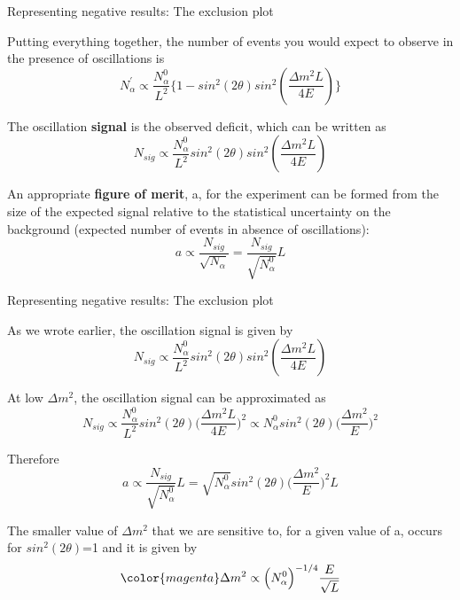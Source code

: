 \begin{frame}{Representing negative results: The exclusion plot}

Putting everything together,
the number of events you would expect to observe in the presence of oscillations is
\begin{equation*}
     N^{\prime}_{\alpha} \propto \frac{N^{0}_{\alpha}}{L^2}
       \Big\{1 - sin^{2} (2\theta) sin^2(\frac{\Delta m^{2}L}{4E})\Big\}
\end{equation*}

The oscillation {\bf signal} is the observed deficit, which can be written as
\begin{equation*}
     N_{sig} \propto \frac{N^{0}_{\alpha}}{L^2} sin^{2} (2\theta) sin^2(\frac{\Delta m^{2}L}{4E})
\end{equation*}

An appropriate {\bf figure of merit}, a, for the experiment can be formed from
the size of the expected signal relative to the statistical uncertainty on the
background (expected number of events in absence of oscillations):
\begin{equation*}
     a \propto \frac{N_{sig}}{\sqrt{N_{\alpha}}} = \frac{N_{sig}}{\sqrt{N^{0}_{\alpha}}} L
\end{equation*}

\end{frame}

%
%
%

\begin{frame}{Representing negative results: The exclusion plot}

As we wrote earlier, the oscillation signal is given by
\begin{equation*}
     N_{sig} \propto \frac{N^{0}_{\alpha}}{L^2} sin^{2} (2\theta) sin^2(\frac{\Delta m^{2}L}{4E})
\end{equation*}

At low $\Delta m^{2}$, the oscillation signal can be approximated as
\begin{equation*}
     N_{sig} \propto
       \frac{N^{0}_{\alpha}}{L^2}
         sin^{2} (2\theta) \Big(\frac{\Delta m^{2}L}{4E}\Big)^2 \propto
        N^{0}_{\alpha} sin^{2} (2\theta) \Big(\frac{\Delta m^{2}}{E}\Big)^2
\end{equation*}

Therefore
\begin{equation*}
     a \propto \frac{N_{sig}}{\sqrt{N^{0}_{\alpha}}} L =
              \sqrt{N^{0}_{\alpha}} sin^{2} (2\theta) \Big(\frac{\Delta m^{2}}{E}\Big)^2 L
\end{equation*}

The smaller value of $\Delta m^{2}$ that we are sensitive to,
for a given value of a, occurs for $sin^{2} (2\theta)$=1 and it is given by
\begin{equation*}
 {\color{magenta}
  \Delta m^{2} \propto \Big(N^{0}_{\alpha}\Big)^{-1/4} \frac{E}{\sqrt{L}}
 }
\end{equation*}

\end{frame}

